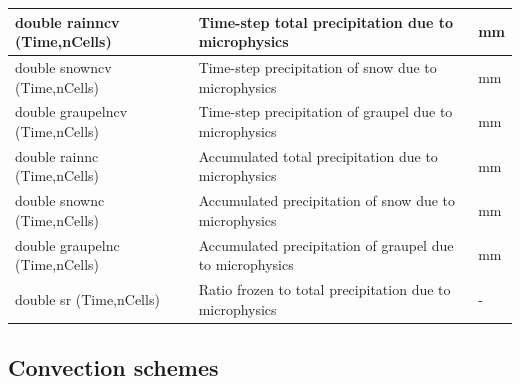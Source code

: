 \documentclass[11pt]{report}
\begin{document}
{\small
\begin{longtable}{|p{2.0in} |p{3.5in} |p{0.5in} |}
\hline
        double rainncv (Time,nCells) & Time-step total precipitation due to microphysics & mm \\ \hline
        double snowncv (Time,nCells) & Time-step precipitation of snow due to microphysics & mm \\ \hline
        double graupelncv (Time,nCells) & Time-step precipitation of graupel due to microphysics & mm \\ \hline
        double rainnc (Time,nCells) & Accumulated total precipitation due to microphysics & mm \\ \hline
        double snownc (Time,nCells) & Accumulated precipitation of snow due to microphysics & mm \\ \hline
        double graupelnc (Time,nCells) & Accumulated precipitation of graupel due to microphysics & mm \\ \hline
        double sr (Time,nCells) & Ratio frozen to total precipitation due to microphysics & - \\ \hline
\end{longtable}
}

\subsection{Convection schemes}
\end{document}
